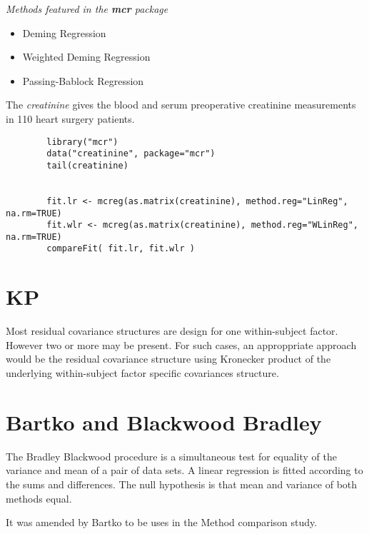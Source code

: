 \documentclass[12pt, a4paper]{report}
\theoremstyle{plain}
\theoremstyle{definition}
\theoremstyle{remark}
\begin{document}
	
	\textit{Methods featured in the \textbf{mcr} package}
	
	\begin{itemize}
		\item Deming Regression
		\item Weighted Deming Regression
		\item Passing-Bablock Regression
	\end{itemize}
	
	The \textit{creatinine} gives the blood and serum preoperative creatinine measurements in 110 heart surgery patients.
	
	\begin{framed}
		\begin{verbatim}
		library("mcr")
		data("creatinine", package="mcr")
		tail(creatinine)
		
		
		fit.lr <- mcreg(as.matrix(creatinine), method.reg="LinReg", na.rm=TRUE)
		fit.wlr <- mcreg(as.matrix(creatinine), method.reg="WLinReg", na.rm=TRUE)
		compareFit( fit.lr, fit.wlr )
		\end{verbatim}
	\end{framed}
	
	

	\section{KP}
	Most residual covariance structures are design for one
	within-subject factor. However two or more may be present. For
	such cases, an approppriate approach would be the residual
	covariance structure using Kronecker product of the underlying
	within-subject factor specific covariances structure.
	
	

\section{Bartko and Blackwood Bradley}

The Bradley Blackwood procedure is a simultaneous test for equality of the variance and mean of a pair of data sets. 
A linear regression is fitted according to the sums and differences.
The null hypothesis is that mean and variance of both methods equal.





It was amended by Bartko to be uses in the Method comparison study.
\end{document}
